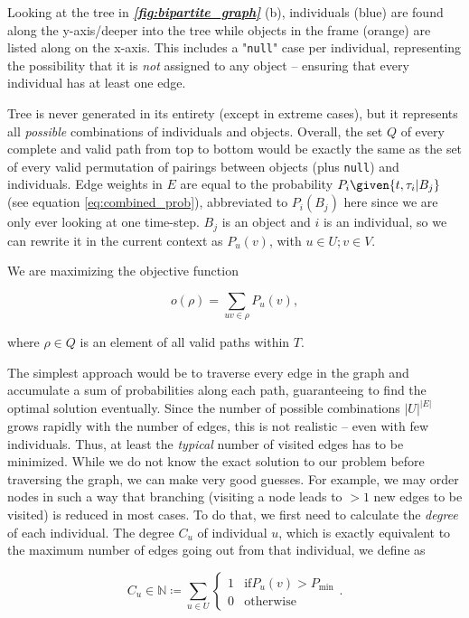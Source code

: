 \documentclass[9pt,lineno]{elife}
\newcommand{\figref}[1]{\textit{\textbf{\ref{#1}}}}
\begin{document}
\begin{appendixbox}
Looking at the tree in \figref{fig:bipartite_graph} (b), individuals (blue) are found along the y-axis/deeper into the tree while objects in the frame (orange) are listed along on the x-axis. This includes a "\texttt{null}" case per individual, representing the possibility that it is \textit{not} assigned to any object -- ensuring that every individual has at least one edge.

Tree is never generated in its entirety (except in extreme cases), but it represents all \textit{possible} combinations of individuals and objects. Overall, the set $Q$ of every complete and valid path from top to bottom would be exactly the same as the set of every valid permutation of pairings between objects (plus \texttt{null}) and individuals. Edge weights in $E$ are equal to the probability $P_i\given{t,\tau_i|B_j}$ (see equation \ref{eq:combined_prob}), abbreviated to $P_i(B_j)$ here since we are only ever looking at one time-step. $B_j$ is an object and $i$ is an individual, so we can rewrite it in the current context as $P_{u}(v)$, with $u\in U; v \in V$.

We are maximizing the objective function

$$ o(\rho) = \sum_{uv \in \rho} P_u(v), $$

where $\rho\in Q$ is an element of all valid paths within $T$.

The simplest approach would be to traverse every edge in the graph and accumulate a sum of probabilities along each path, guaranteeing to find the optimal solution eventually. Since the number of possible combinations $|U|^{|E|}$ grows rapidly with the number of edges, this is not realistic -- even with few individuals. Thus, at least the \textit{typical} number of visited edges has to be minimized. While we do not know the exact solution to our problem before traversing the graph, we can make very good guesses. For example, we may order nodes in such a way that branching (visiting a node leads to $>1$ new edges to be visited) is reduced in most cases. To do that, we first need to calculate the \textit{degree} of each individual. The degree $C_u$ of individual $u$, which is exactly equivalent to the maximum number of edges going out from that individual, we define as

$$ C_u \in \mathbb{N} \coloneqq \sum_{u\in U} \begin{cases} 1 & \mathrm{if } P_u(v) > P_\mathrm{min}\\ 0 & \mathrm{otherwise} \end{cases}. $$


\end{appendixbox}
\end{document}
